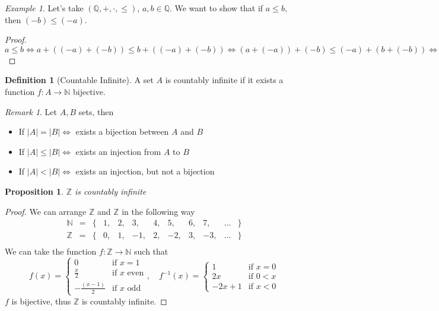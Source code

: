 \documentclass{article}
\newcommand{\bb}[1]{\mathbb{#1}}
\newcommand{\fr}[2]{\frac{#1}{#2}}
\newcommand{\fToN}[2]{#1 : #2 \rightarrow \mathbb{N}}
\theoremstyle{definition}
\newtheorem{definition}{Definition}[section]
\theoremstyle{definition}
\theoremstyle{plain}
\theoremstyle{plain}
\theoremstyle{plain}
\theoremstyle{plain}
\newtheorem{proposition}[theorem]{Proposition}
\theoremstyle{definition}
\theoremstyle{remark}
\newtheorem{exampled}{Example}[definition]
\theoremstyle{remark}
\theoremstyle{remark}
\theoremstyle{remark}
\newtheorem*{remark}{Remark}
\newcommand{\Z}{\mathbb{Z}}
\newcommand{\Q}{\mathbb{Q}}
\begin{document}
\begin{exampled}
  Let's take $(\Q, +, \cdot, \leq)$, $a, b \in \Q$. We want to show that if $a \leq b$, then $(-b) \leq (-a)$.
\end{exampled}

\begin{proof}
  $a \leq b \iff a + ((-a) + (-b)) \leq b + ((-a) + (-b)) \iff (a + (-a)) + (-b) \leq (-a) + (b + (-b)) \iff (-b) + 0 \leq (-a) + 0 \iff (-b) \leq (-a)$
\end{proof}


\begin{definition}[Countable Infinite]
  A set $A$ is countably infinite if it exists a function $\fToN{f}{A}$ bijective.
\end{definition}

\begin{remark}
  Let $A, B$ sets, then
  \begin{itemize}
  \item If $|A| = |B| \iff$ exists a bijection between $A$ and $B$
  \item If $|A| \leq |B| \iff$ exists an injection from $A$ to $B$
  \item If $|A| < |B| \iff$ exists an injection, but not a bijection
  \end{itemize}
\end{remark}


\begin{proposition}
  $\Z$ is countably infinite
\end{proposition}

\begin{proof}
  We can arrange $\Z$ and $\Z$ in the following way
  \[
  \begin{array}{lcrccccccccl}
    \bb{N} & = & \{ & 1, & 2, & 3, & 4, & 5, & 6, & 7, & \hdots & \} \\
    \bb{Z} & = & \{ & 0, & 1, & -1,& 2, & -2,& 3, & -3,& \hdots & \} \\
  \end{array}
  \]
  We can take the function $\fToN{f}{\Z}$ such that
  \[
  f(x) = \begin{cases}
    0 & \text{if } x = 1 \\
    \fr{x}{2} & \text{if } x \text{ even} \\
    -\fr{(x - 1)}{2} & \text{if } x \text{ odd}
  \end{cases}, \quad
  f^{-1}(x) = \begin{cases}
    1 & \text{if } x = 0 \\
    2x & \text{if } 0 < x \\
    -2x+1 & \text{if } x < 0
  \end{cases}
  \]
  $f$ is bijective, thus $\Z$ is countably infinite.
\end{proof}
\end{document}
